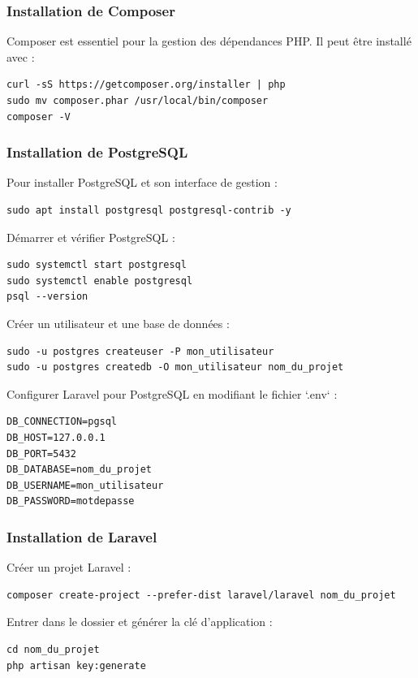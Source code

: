 \subsubsection{Installation de Composer}
Composer est essentiel pour la gestion des dépendances PHP. Il peut être installé avec :
\begin{verbatim}
curl -sS https://getcomposer.org/installer | php
sudo mv composer.phar /usr/local/bin/composer
composer -V
\end{verbatim}

\subsubsection{Installation de PostgreSQL}
Pour installer PostgreSQL et son interface de gestion :
\begin{verbatim}
sudo apt install postgresql postgresql-contrib -y
\end{verbatim}
Démarrer et vérifier PostgreSQL :
\begin{verbatim}
sudo systemctl start postgresql
sudo systemctl enable postgresql
psql --version
\end{verbatim}
Créer un utilisateur et une base de données :
\begin{verbatim}
sudo -u postgres createuser -P mon_utilisateur
sudo -u postgres createdb -O mon_utilisateur nom_du_projet
\end{verbatim}
Configurer Laravel pour PostgreSQL en modifiant le fichier `.env` :
\begin{verbatim}
DB_CONNECTION=pgsql
DB_HOST=127.0.0.1
DB_PORT=5432
DB_DATABASE=nom_du_projet
DB_USERNAME=mon_utilisateur
DB_PASSWORD=motdepasse
\end{verbatim}

\subsubsection{Installation de Laravel}
Créer un projet Laravel :
\begin{verbatim}
composer create-project --prefer-dist laravel/laravel nom_du_projet
\end{verbatim}
Entrer dans le dossier et générer la clé d’application :
\begin{verbatim}
cd nom_du_projet
php artisan key:generate
\end{verbatim}

